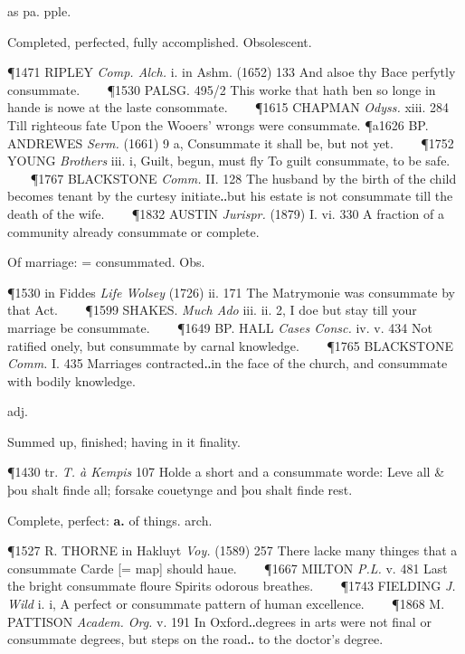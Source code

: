 \begin{description}[wide, labelwidth=!, labelindent=0pt]
\begin{myenumerate}

 as pa. pple.

 Completed, perfected, fully accomplished. Obsolescent.

\P 1471 RIPLEY  \textit{Comp. Alch.} i. in Ashm. (1652) 133 And alsoe thy Bace perfytly consummate.    
\P 1530 PALSG.  495/2 This worke that hath ben so longe in hande is nowe at the laste consommate.    
\P 1615 CHAPMAN  \textit{Odyss.} xiii. 284 Till righteous fate Upon the Wooers' wrongs were consummate.
\P a1626 BP. ANDREWES  \textit{Serm.} (1661) 9 a, Consummate it shall be, but not yet.    
\P 1752 YOUNG  \textit{Brothers} iii. i, Guilt, begun, must fly To guilt consummate, to be safe.    
\P 1767 BLACKSTONE  \textit{Comm.} II. 128 The husband by the birth of the child becomes tenant by the curtesy initiate‥but his estate is not consummate till the death of the wife.    
\P 1832 AUSTIN  \textit{Jurispr.} (1879) I. vi. 330 A fraction of a community already consummate or complete.

 Of marriage: = consummated. Obs.

\P 1530 in Fiddes  \textit{Life Wolsey} (1726) ii. 171 The Matrymonie was consummate by that Act.    
\P 1599 SHAKES.  \textit{Much Ado} iii. ii. 2, I doe but stay till your marriage be consummate.    
\P 1649 BP. HALL  \textit{Cases Consc.} iv. v. 434 Not ratified onely, but consummate by carnal knowledge.    
\P 1765 BLACKSTONE  \textit{Comm.} I. 435 Marriages contracted‥in the face of the church, and consummate with bodily knowledge.

 adj.

 Summed up, finished; having in it finality.

\P 1430 tr.  \textit{T. à Kempis} 107 Holde a short and a consummate worde: Leve all \& þou shalt finde all; forsake couetynge and þou shalt finde rest.

 Complete, perfect: \textbf{a.} of things. arch.

\P 1527 R. THORNE in  Hakluyt \textit{Voy.} (1589) 257 There lacke many thinges that a consummate Carde [= map] should haue.    
\P 1667 MILTON  \textit{P.L.} v. 481 Last the bright consummate floure Spirits odorous breathes.    
\P 1743 FIELDING  \textit{J. Wild} i. i, A perfect or consummate pattern of human excellence.    
\P 1868 M. PATTISON  \textit{Academ. Org.} v. 191 In Oxford‥degrees in arts were not final or consummate degrees, but steps on the road‥ to the doctor's degree.


\end{myenumerate}
\end{description}
